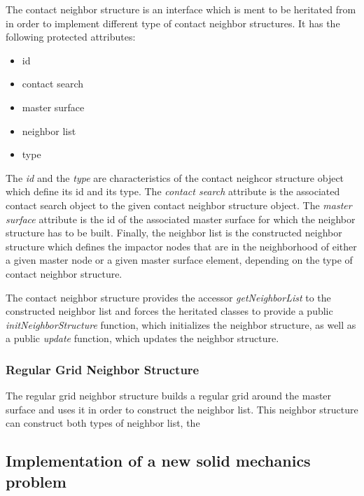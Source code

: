 \documentclass[a4paper,11pt]{book}
\begin{document}
The contact neighbor structure is an interface which is ment to be heritated from in order to implement different type of contact neighbor structures. It has the following protected attributes:
\begin{itemize}
  \item id
  \item contact search
  \item master surface
  \item neighbor list
  \item type
\end{itemize}
The \emph{id} and the \emph{type} are characteristics of the contact neighcor structure object which define its id and its type. The \emph{contact search} attribute is the associated contact search object to the given contact neighbor structure object. The \emph{master surface} attribute is the id of the associated master surface for which the neighbor structure has to be built. Finally, the neighbor list is the constructed neighbor structure which defines the impactor nodes that are in the neighborhood of either a given master node or a given master surface element, depending on the type of contact neighbor structure.

The contact neighbor structure provides the accessor \emph{getNeighborList} to the constructed neighbor list and forces the heritated classes to provide a public \emph{initNeighborStructure} function, which initializes the neighbor structure, as well as a public \emph{update} function, which updates the neighbor structure.

\subsubsection{Regular Grid Neighbor Structure}

The regular grid neighbor structure builds a regular grid around the master surface and uses it in order to construct the neighbor list. This neighbor structure can construct both types of neighbor list, the 


\subsection{Implementation of a new solid mechanics problem}
\end{document}
